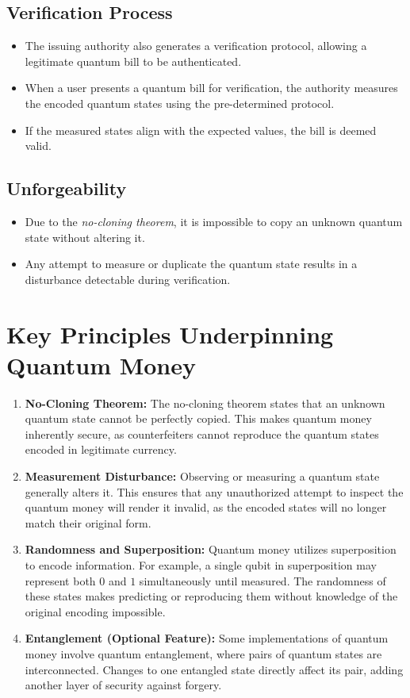 \documentclass[11pt]{article}
\theoremstyle{definition}
\begin{document}
\subsection*{Verification Process}
\begin{itemize}
    \item The issuing authority also generates a verification protocol, allowing a legitimate quantum bill to be authenticated.
    \item When a user presents a quantum bill for verification, the authority measures the encoded quantum states using the pre-determined protocol.
    \item If the measured states align with the expected values, the bill is deemed valid.
\end{itemize}

\subsection*{Unforgeability}
\begin{itemize}
    \item Due to the \textit{no-cloning theorem}, it is impossible to copy an unknown quantum state without altering it.
    \item Any attempt to measure or duplicate the quantum state results in a disturbance detectable during verification.
\end{itemize}

\section*{Key Principles Underpinning Quantum Money}
\begin{enumerate}
    \item \textbf{No-Cloning Theorem:} The no-cloning theorem states that an unknown quantum state cannot be perfectly copied. This makes quantum money inherently secure, as counterfeiters cannot reproduce the quantum states encoded in legitimate currency.
    \item \textbf{Measurement Disturbance:} Observing or measuring a quantum state generally alters it. This ensures that any unauthorized attempt to inspect the quantum money will render it invalid, as the encoded states will no longer match their original form.
    \item \textbf{Randomness and Superposition:} Quantum money utilizes superposition to encode information. For example, a single qubit in superposition may represent both $0$ and $1$ simultaneously until measured. The randomness of these states makes predicting or reproducing them without knowledge of the original encoding impossible.
    \item \textbf{Entanglement (Optional Feature):} Some implementations of quantum money involve quantum entanglement, where pairs of quantum states are interconnected. Changes to one entangled state directly affect its pair, adding another layer of security against forgery.
\end{enumerate}
\end{document}
